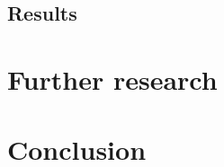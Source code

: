 \documentclass[twoside,11pt]{article}
\begin{document}

\subsection{Results}




\section{Further research}
\label{sec:further_research}

\section{Conclusion}
\end{document}
